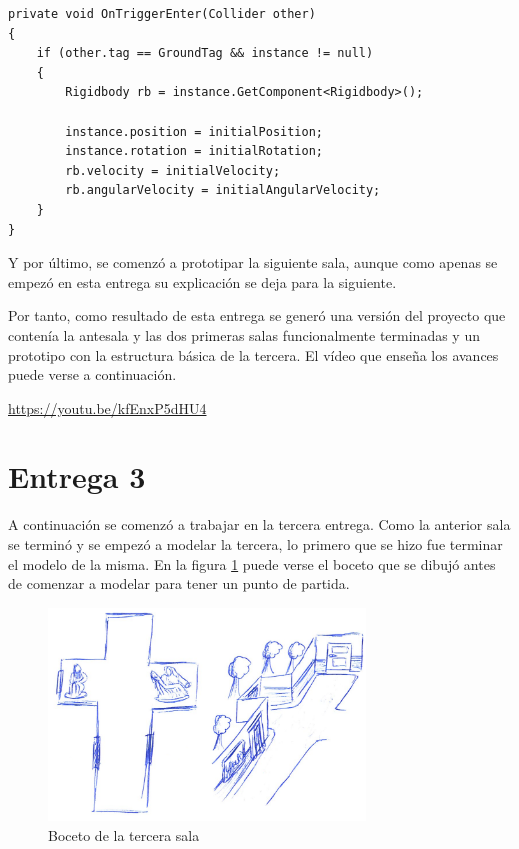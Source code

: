\begin{lstlisting}[caption=Fragmento del script para teletransportar un objeto si toca el suelo, label=lst:object-teletransporter]
private void OnTriggerEnter(Collider other)
{
    if (other.tag == GroundTag && instance != null)
    {
        Rigidbody rb = instance.GetComponent<Rigidbody>();

        instance.position = initialPosition;
        instance.rotation = initialRotation;
        rb.velocity = initialVelocity;
        rb.angularVelocity = initialAngularVelocity;
    }
}
\end{lstlisting}


Y por último, se comenzó a prototipar la siguiente sala, aunque como apenas se empezó en esta entrega su explicación se deja para la siguiente.

Por tanto, como resultado de esta entrega se generó una versión del proyecto que contenía la antesala y las dos primeras salas funcionalmente terminadas y un prototipo con la estructura básica de la tercera. El vídeo que enseña los avances puede verse a continuación.

\begin{center}
    \url{https://youtu.be/kfEnxP5dHU4}
\end{center}



\section{Entrega 3}

A continuación se comenzó a trabajar en la tercera entrega. Como la anterior sala se terminó y se empezó a modelar la tercera, lo primero que se hizo fue terminar el modelo de la misma. En la figura \ref{fig:bocetos-sala-3} puede verse el boceto que se dibujó antes de comenzar a modelar para tener un punto de partida.

\begin{figure}[!h]
\begin{center}
\includegraphics[width=0.75\textwidth]{imagenes/7/bocetos/boceto-sala-3.png}
\caption{Boceto de la tercera sala}
\label{fig:bocetos-sala-3}
\end{center}
\end{figure}

